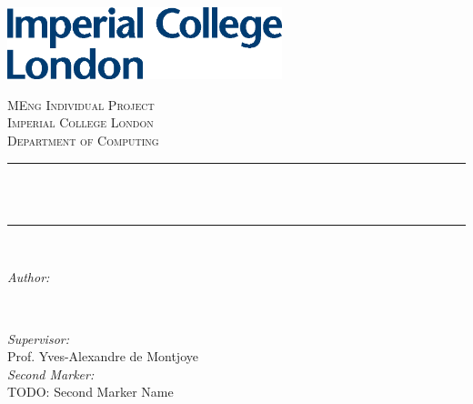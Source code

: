 \begin{titlepage}

\newcommand{\HRule}{\rule{\linewidth}{0.5mm}} 


\includegraphics[width=8cm]{title/logo.eps}\\[1cm]
 

\center %


\textsc{\LARGE MEng Individual Project}\\[1.5cm] 
\textsc{\Large Imperial College London}\\[0.5cm]
\textsc{\large Department of Computing}\\[0.5cm]

\makeatletter
\HRule \\[0.4cm]
{ \huge \bfseries \@title}\\[0.4cm]
\HRule \\[1.5cm]
 

\begin{minipage}{0.4\textwidth}
\begin{flushleft} \large
\emph{Author:}\\
\@author %
\end{flushleft}
\end{minipage}
~
\begin{minipage}{0.4\textwidth}
\begin{flushright} \large
\emph{Supervisor:} \\
Prof. Yves-Alexandre de Montjoye \\[1.2em]
\emph{Second Marker:} \\
TODO: Second Marker Name
\end{flushright}
\end{minipage}\\[2cm]
\makeatother


\end{titlepage}
